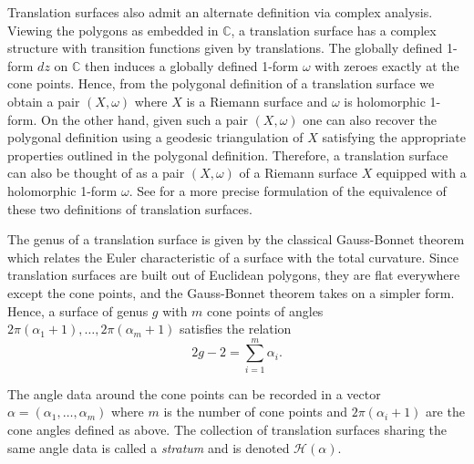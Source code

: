 \documentclass[12pt]{amsart}
\numberwithin{equation}{section}
\numberwithin{theorem}{section}
\newcommand{\calH}{\mathcal{H}}
\newcommand{\CC}{\mathbb{C}}
\begin{document}
Translation surfaces also admit an alternate definition via complex analysis. Viewing the polygons as embedded in $\CC$, a translation surface has a complex structure with transition functions given by translations. The globally defined 1-form $dz$ on $\CC$ then induces a globally defined 1-form $\omega$ with zeroes exactly at the cone points. Hence, from the polygonal definition of a translation surface we obtain a pair $(X, \omega)$ where $X$ is a Riemann surface and $\omega$ is holomorphic 1-form. On the other hand, given such a pair $(X, \omega)$ one can also recover the polygonal definition using a geodesic triangulation of $X$ satisfying the appropriate properties outlined in the polygonal definition. Therefore, a translation surface can also be thought of as a pair $(X, \omega)$ of a Riemann surface $X$ equipped with a holomorphic 1-form $\omega$. See \cite{Masur2} for a more precise formulation of the equivalence of these two definitions of translation surfaces.  

The genus of a translation surface is given by the classical Gauss-Bonnet theorem which relates the Euler characteristic of a surface with the total curvature. Since translation surfaces are built out of Euclidean polygons, they are flat everywhere except the cone points, and the Gauss-Bonnet theorem takes on a simpler form. Hence, a surface of genus $g$ with $m$ cone points of angles $2 \pi(\alpha_1+1), \dots, 2 \pi (\alpha_m +1)$ satisfies the relation 
$$ 
2g - 2 = \sum_{i=1}^m \alpha_i.
$$

The angle data around the cone points can be recorded in a vector $\alpha = (\alpha_1, \dots, \alpha_m)$ where $m$ is the number of cone points and $2\pi(\alpha_i+1)$ are the cone angles defined as above. The collection of translation surfaces sharing the same angle data is called a \emph{stratum} and is denoted $\calH(\alpha)$. 
\end{document}
